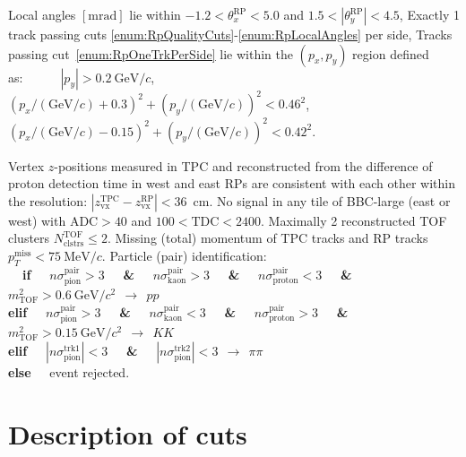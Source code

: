 \begin{enumerate}[label=\textbf{C\arabic*},ref=C\arabic*]
\begin{enumerate}[label=\textbf{\theenumi.\arabic*},ref=\theenumi.\arabic*]
      \itemm Local angles $[\textrm{mrad}]$ lie within $-1.2<\theta_{x}^{\textrm{RP}}<5.0$ and $1.5<|\theta_{y}^{\textrm{RP}}|<4.5$,\label{enum:RpLocalAngles}
      \itemm Exactly 1 track passing cuts \ref{enum:RpQualityCuts}-\ref{enum:RpLocalAngles} per side,\label{enum:RpOneTrkPerSide}
      \itemm Tracks passing cut~\ref{enum:RpOneTrkPerSide} lie within the $(p_{x},p_{y})$ region defined as\label{enum:RpFiducial}:~~~~~~$|p_{y}|>0.2~\textrm{GeV}/c$,\\[4pt]
      $(p_{x}/(\textrm{GeV}/c)+0.3)^{2}+(p_{y}/(\textrm{GeV}/c))^{2}<0.46^{2}$,~~~~~~~$(p_{x}/(\textrm{GeV}/c)-0.15)^{2}+(p_{y}/(\textrm{GeV}/c))^{2}<0.42^{2}$.
    \end{enumerate}
 \itemm Vertex $z$-positions measured in TPC and reconstructed from the difference of proton detection time in west and east RPs are consistent with each other within the resolution: $|z_{\textrm{vx}}^{\textrm{TPC}}-z_{\textrm{vx}}^{\textrm{RP}}|<36$~cm.\label{enum:CutDeltaZVx}
 \itemm No signal in any tile of BBC-large (east or west) with $\textrm{ADC}>40$ and $100<\textrm{TDC}<2400$.\label{enum:CutBbcLarge}
 \itemm Maximally 2 reconstructed TOF clusters $N^{\textrm{TOF}}_{\textrm{clstrs}}\leq 2$.\label{enum:CutTofClusters}
 \itemm Missing (total) momentum of TPC tracks and RP tracks $p_{T}^{\textrm{miss}}<75~\textrm{MeV}/c$.\label{enum:CutMissingPt}
 \itemm Particle (pair) identification:\label{enum:CutPid}\\
 \textbf{~~if~~} $n\sigma_{\textrm{pion}}^{\textrm{pair}}>3$ \textbf{~~\&~~} $n\sigma_{\textrm{kaon}}^{\textrm{pair}}>3$ \textbf{~~\&~~} $n\sigma_{\textrm{proton}}^{\textrm{pair}}<3$ \textbf{~~\&~~} $m^{2}_{\textrm{TOF}}>0.6~\textrm{GeV}/c^{2}~~\rightarrow~~pp$\\%
\textbf{elif~~} $n\sigma_{\textrm{pion}}^{\textrm{pair}}>3$ \textbf{~~\&~~} $n\sigma_{\textrm{kaon}}^{\textrm{pair}}<3$ \textbf{~~\&~~} $n\sigma_{\textrm{proton}}^{\textrm{pair}}>3$ \textbf{~~\&~~} $m^{2}_{\textrm{TOF}}>0.15~\textrm{GeV}/c^{2}~~\rightarrow~~KK$\\%
\textbf{elif~~} $|n\sigma_{\textrm{pion}}^{\textrm{trk1}}|<3$ \textbf{~~\&~~} $|n\sigma_{\textrm{pion}}^{\textrm{trk2}}|<3~~\rightarrow~~\pi\pi$\\%
\textbf{else~~} event rejected.
\end{enumerate}

\section{Description of cuts}\label{sec:descriptionOfCuts}
